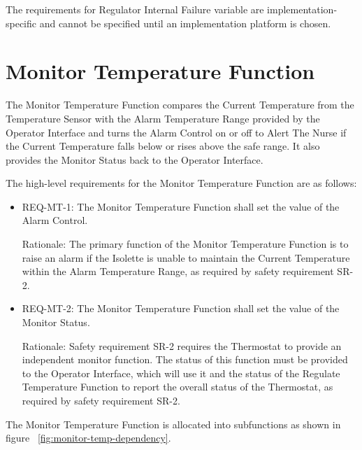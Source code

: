 The requirements for Regulator Internal Failure variable are implementation-specific and cannot
be specified until an implementation platform is chosen.

\section{Monitor Temperature Function}
\label{sec:monitor-temperature}

The Monitor Temperature Function compares the Current Temperature from the Temperature
Sensor with the Alarm Temperature Range provided by the Operator Interface and turns the
Alarm Control on or off to Alert The Nurse if the Current Temperature falls below or rises above
the safe range. It also provides the Monitor Status back to the Operator Interface.

The high-level requirements for the Monitor Temperature Function are as follows:

\begin{itemize}
\item REQ-MT-1: The Monitor Temperature Function shall set the value of the Alarm Control.

      Rationale: The primary function of the Monitor Temperature Function is to raise an
      alarm if the Isolette is unable to maintain the Current Temperature within the Alarm
      Temperature Range, as required by safety requirement SR-2.
\item REQ-MT-2: The Monitor Temperature Function shall set the value of the Monitor Status.

      Rationale: Safety requirement SR-2 requires the Thermostat to provide an independent
      monitor function. The status of this function must be provided to the Operator Interface,
      which will use it and the status of the Regulate Temperature Function to report the
      overall status of the Thermostat, as required by safety requirement SR-2.
\end{itemize}

The Monitor Temperature Function is allocated into subfunctions as shown in figure ~\ref{fig:monitor-temp-dependency}.

